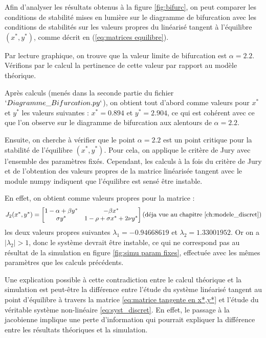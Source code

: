 Afin d'analyser les résultats obtenus à la figure \ref{fig:bifurc}, on peut comparer les conditions de stabilité mises en lumière sur le diagramme de bifurcation avec les conditions de stabilités sur les valeurs propres du linéarisé tangent à l'équilibre $(x^*, y^*)$, comme décrit en (\ref{eq:matrices equilibre}).

Par lecture graphique, on trouve que la valeur limite de bifurcation est $\alpha = 2.2$. Vérifions par le calcul la pertinence de cette valeur par rapport au modèle théorique.

Après calculs (menés dans la seconde partie du fichier $`Diagramme\_Bifurcation.py`$), on obtient tout d'abord comme valeurs pour $x^*$ et $y^*$ les valeurs suivantes : $x^* = 0.894$ et $y^* = 2.904$, ce qui est cohérent avec ce que l'on observe sur le diagramme de bifurcation aux alentours de $\alpha = 2.2$.

Ensuite, on cherche à vérifier que le point $\alpha = 2.2$ est un point critique pour la stabilité de l'équilibre $(x^*, y^*)$. Pour cela, on applique le critère de Jury avec l'ensemble des paramètres fixés. Cependant, les calculs à la fois du critère de Jury et de l'obtention des valeurs propres de la matrice linéarisée tangent avec le module numpy indiquent que l'équilibre est sensé être instable.

En effet, on obtient comme valeurs propres pour la matrice :
\begin{equation}
	\label{eq:matrice tangente en x*,y*}
	J_{2}(x^*, y^*) = 
  	\begin{bmatrix}
    	1 - \alpha + \beta y^* & - \beta x^* \\
    	\sigma y^* & 1 - \rho + \sigma x^* + 2 \nu y^*
  	\end{bmatrix}
	\text{(déja vue au chapitre \ref{ch:modele_discret})}
\end{equation}
les deux valeurs propres suivantes $\lambda_1 = -0.94668619$ et $\lambda_2 = 1.33001952$. Or on a $|\lambda_2| > 1$, donc le système devrait être instable, ce qui ne correspond pas au résultat de la simulation en figure \ref{fig:simu param fixes}, effectuée avec les mêmes paramètres que les calculs précédents.

Une explication possible à cette contradiction entre le calcul théorique et la simulation est peut-être la différence entre l'étude du système linéarisé tangent au point d'équilibre à travers la matrice \ref{eq:matrice tangente en x*,y*} et l'étude du véritable système non-linéaire \ref{eq:syst_discret}. En effet, le passage à la jacobienne implique une perte d'information qui pourrait expliquer la différence entre les résultats théoriques et la simulation.




